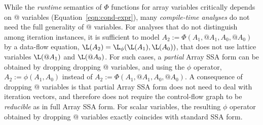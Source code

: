 While the  {\em runtime} semantics of 
$\Phi$ functions for array variables critically depends on @ variables (Equation~\ref{eqn:cond-expr}),
many {\em compile-time analyses} do not need the full generality of @ variables.  
For analyses that do not distinguish among iteration instances,
it is sufficient to model
$A_2 := \Phi(A_1, @A_1, A_0, @A_0)$ by
a data-flow equation, $\L(A_2) = \L_{\phi}(\L(A_1), \L(A_0))$,
that does not use lattice variables $\L(@A_1)$ and $\L(@A_0)$.
For such cases, a {\it partial}
Array SSA form can be obtained by dropping 
dropping @ variables, and using the
$\phi$ operator, $A_2 := \phi(A_1, A_0)$ instead of
$A_2 := \Phi(A_1, @A_1, A_0, @A_0)$.  
A consequence of dropping @ variables is that partial Array
SSA form does not need to deal with iteration
vectors, and therefore does not require the control-flow graph to be {\it reducible} as in full Array SSA form.
For scalar variables, the resulting $\phi$ operator obtained by
dropping @ variables exactly coincides with standard SSA form.





